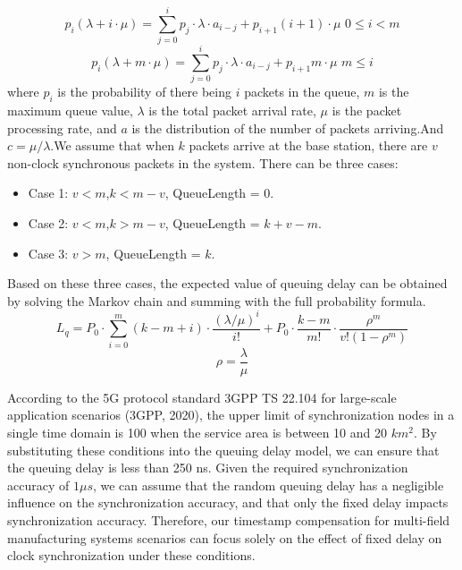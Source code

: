 \documentclass[english]{cccconf}
\begin{document}
\begin{equation*}
	p_i\left( \lambda +i\cdot \mu \right) =\sum_{j=0}^i{p_j\cdot \lambda \cdot a_{i-j}+p_{i+1}\left( i+1 \right) \cdot \mu\,\, 0\leqslant i<m}
\end{equation*}
\begin{equation}
	p_i\left( \lambda +m\cdot \mu \right) =\sum_{j=0}^i{p_j\cdot \lambda \cdot a_{i-j}+p_{i+1}m\cdot \mu}\,\, m\leqslant i
\end{equation}
where $p_i$ is the probability of there being $i$ packets in the queue, $m$ is the maximum queue value, $\lambda$ is the total packet arrival rate, $\mu$ is the packet processing rate, and $a$ is the distribution of the number of packets arriving.And $c=\mu/\lambda $.We assume that when $k$ packets arrive at the base station, there are $v$ non-clock synchronous packets in the system. There can be three cases:
\begin{itemize}
	\item Case 1: $v<m$,$k<m-v$, QueueLength = 0.
	\item Case 2: $v<m$,$k>m-v$, QueueLength = $k+v-m$.
	\item Case 3: $v>m$, QueueLength = $k$.
\end{itemize}

Based on these three cases, the expected value of queuing delay can be obtained by solving the Markov chain and summing with the full probability formula.
\begin{equation*}
	L_q=P_0\cdot \sum_{i=0}^m{\left(k-m+i\right)\cdot \frac{\left(\lambda/\mu\right)^i}{i!}+P_0\cdot \frac{k-m}{m!}\cdot \frac{\rho^m}{v!\left(1-\rho^m\right)}}
\end{equation*}
\begin{equation}
	\rho=\frac{\lambda}{\mu}
\end{equation}

According to the 5G protocol standard 3GPP TS 22.104 for large-scale application scenarios (3GPP, 2020), the upper limit of synchronization nodes in a single time domain is 100 when the service area is between 10 and 20 $km^2$\cite{888889}. By substituting these conditions into the queuing delay model, we can ensure that the queuing delay is less than 250 ns. Given the required synchronization accuracy of $1\mu s$, we can assume that the random queuing delay has a negligible influence on the synchronization accuracy, and that only the fixed delay impacts synchronization accuracy. Therefore, our timestamp compensation for multi-field manufacturing systems scenarios can focus solely on the effect of fixed delay on clock synchronization under these conditions.
\end{document}

